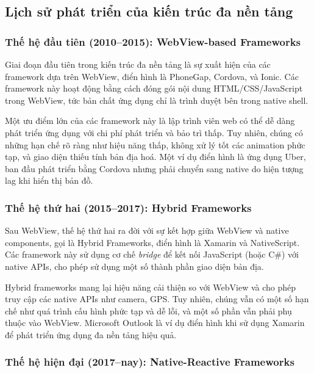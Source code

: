 \subsection{Lịch sử phát triển của kiến trúc đa nền tảng}

\subsubsection{Thế hệ đầu tiên (2010–2015): WebView-based Frameworks}
\hspace*{1.3em} Giai đoạn đầu tiên trong kiến trúc đa nền tảng là sự xuất hiện của các framework dựa trên WebView, điển hình là PhoneGap, Cordova, và Ionic. Các framework này hoạt động bằng cách đóng gói nội dung HTML/CSS/JavaScript trong WebView, tức bản chất ứng dụng chỉ là trình duyệt bên trong native shell.

\indent Một ưu điểm lớn của các framework này là lập trình viên web có thể dễ dàng phát triển ứng dụng với chi phí phát triển và bảo trì thấp. Tuy nhiên, chúng có những hạn chế rõ ràng như hiệu năng thấp, không xử lý tốt các animation phức tạp, và giao diện thiếu tính bản địa hoá. Một ví dụ điển hình là ứng dụng Uber, ban đầu phát triển bằng Cordova nhưng phải chuyển sang native do hiện tượng lag khi hiển thị bản đồ.

\subsubsection{Thế hệ thứ hai (2015–2017): Hybrid Frameworks}

\hspace*{1.3em} Sau WebView, thế hệ thứ hai ra đời với sự kết hợp giữa WebView và native components, gọi là Hybrid Frameworks, điển hình là Xamarin và NativeScript. Các framework này sử dụng cơ chế \textit{bridge} để kết nối JavaScript (hoặc C\#) với native APIs, cho phép sử dụng một số thành phần giao diện bản địa.

\indent Hybrid frameworks mang lại hiệu năng cải thiện so với WebView và cho phép truy cập các native APIs như camera, GPS. Tuy nhiên, chúng vẫn có một số hạn chế như quá trình cấu hình phức tạp và dễ lỗi, và một số phần vẫn phải phụ thuộc vào WebView. Microsoft Outlook là ví dụ điển hình khi sử dụng Xamarin để phát triển ứng dụng đa nền tảng hiệu quả.

\subsubsection{Thế hệ hiện đại (2017–nay): Native-Reactive Frameworks}

